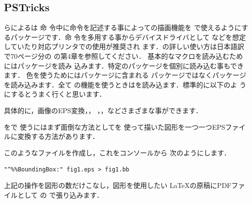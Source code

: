 \subsection{\textsf{PSTricks}}
らによるは 命
令中に{\PS}命令を記述する事によって{\PS}の描画機能を
{\laTEX}で使えるようにするパッケージです．{\PS}命
令を多用する事からデバイスドライバとして
などを想定していたり{\PS}対応プリンタでの使用が推奨され
ます．の詳しい使い方は日本語訳で70ページ分の
\wasyo{\GCOMP}\cite{graphicscomp}の第4章を参照してください．
基本的なマクロを読み込むためにはパッケージを読み
込みます．特定のパッケージを個別に読み込む事もできます．
色を使うためにはパッケージに含まれる
パッケージではなくパッケージを読み込みます．全て
の機能を使うときはを読み込ます．標準的に以下のよ
うにするとうまく行くと思います．

\begin{InTeX}
\usepackage[dvips]{graphicx}
\usepackage[dvips,usenames]{pst-col} 
\usepackage{pst-all}
\end{InTeX}

具体的に，画像のEPS変換，，
，，などさまざまな事ができます．

を\Prog[dvipdfmx]{\Dvipdfmx}で
使うにはまず面倒な方法としてを
使って描いた図形を一つ一つEPSファイルに変換する方法があります．


このようなファイルを作成し，これをコンソールから
次のようにします．
\begin{InTerm}
 \verb|"^%%BoundingBox:" fig1.eps > fig1.bb|
\end{InTerm}

上記の操作を図形の数だけこなし，図形を使用したい
{\LaTeX}の原稿にPDFファイルとして
の で張り込みます．

